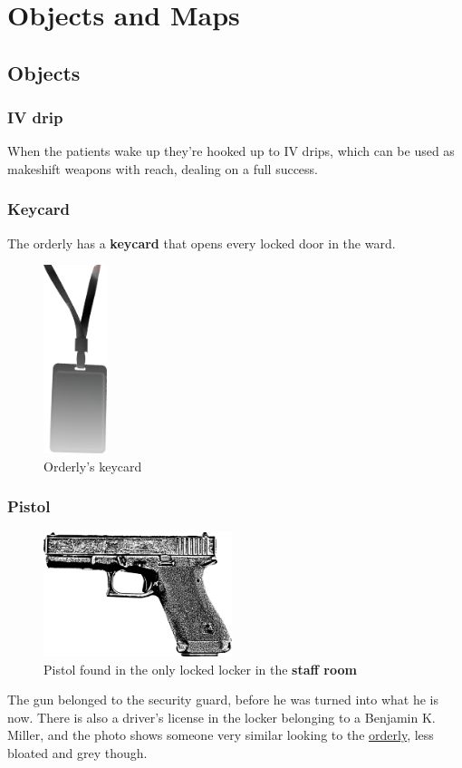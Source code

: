 \section{Objects and Maps}%
\label{sec:objects_and_maps}

\twocolumn
\subsection{Objects}%
\label{sub:objects}

\subsubsection{IV drip}%
\label{ssub:iv_drip}

When the patients wake up they're hooked up to IV drips, which can be used as makeshift weapons with reach, dealing 
on a full success.

\subsubsection{Keycard}%
\label{ssub:keycard}

The orderly has a \textbf{keycard} that opens every locked door in the ward.
\begin{figure}[!htbp]
  \centering
  \includegraphics[height=5.5cm, keepaspectratio]{resources/img/keycard.png}
  \caption{Orderly's keycard}\label{keycard}
\end{figure}

\subsubsection{Pistol}%
\label{ssub:pistol}

\begin{figure}[!htbp]
  \centering
  \includegraphics[width=5.5cm, keepaspectratio]{resources/img/glock.png}
  \caption{Pistol found in the only locked locker in the \textbf{staff room}}\label{pistol}
\end{figure}
The gun belonged to the security guard, before he was turned into what he is now.  There is also a driver's license in the
locker belonging to a Benjamin K. Miller, and the photo shows someone very similar looking to the
\hyperref[ssub:orderly]{orderly}, less bloated and grey though.



